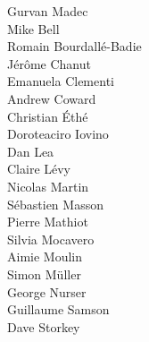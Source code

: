 
 Gurvan Madec                \\
                            Mike Bell                   \\
 Romain Bourdall\'{e}-Badie  \\
                            J\'{e}r\^{o}me Chanut       \\
 Emanuela Clementi           \\
 Andrew Coward               \\
                            Christian \'{E}th\'{e}      \\
 Doroteaciro Iovino          \\
                            Dan Lea                     \\
 Claire L\'{e}vy             \\
                            Nicolas Martin              \\
 S\'{e}bastien Masson        \\
                            Pierre Mathiot              \\
 Silvia Mocavero             \\
                            Aimie Moulin                \\
                            Simon M\"{u}ller            \\
                            George Nurser               \\
 Guillaume Samson            \\
                            Dave Storkey                \\
